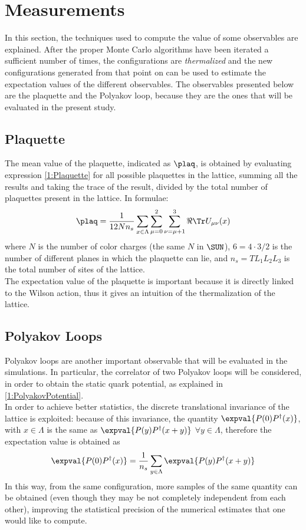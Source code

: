\section{Measurements}
In this section, the techniques used to compute the value of some observables are explained.
After the proper Monte Carlo algorithms have been iterated a sufficient number of times, the configurations are \emph{thermalized} and the new configurations generated from that point on can be used to estimate the expectation values of the different observables.
The observables presented below are the plaquette and the Polyakov loop, because they are the ones that will be evaluated in the present study.

\subsection{Plaquette}
The mean value of the plaquette, indicated as $\plaq$, is obtained by evaluating expression \eqref{1:Plaquette} for all possible plaquettes in the lattice, summing all the results and taking the trace of the result, divided by the total number of plaquettes present in the lattice.
In formulae:
\begin{equation}
    \plaq = \frac{1}{12 N n_s} \sum_{x\in\Lambda} \sum_{\mu=0}^2 \sum_{\substack{\nu=\mu+1}}^3 \Re\Tr U_{\mu\nu}(x) \label{2:LatticePlaquette}
\end{equation}
where $N$ is the number of color charges (the same $N$ in $\SUN$), $6=4\cdot3/2$ is the number of different planes in which the plaquette can lie, and $n_s=TL_1L_2L_3$ is the total number of sites of the lattice.\\
The expectation value of the plaquette is important because it is directly linked to the Wilson action, thus it gives an intuition of the thermalization of the lattice.

\subsection{Polyakov Loops\label{Sec2:PolyakovLoops}}
Polyakov loops are another important observable that will be evaluated in the simulations.
In particular, the correlator of two Polyakov loops will be considered, in order to obtain the static quark potential, as explained in \eqref{1:PolyakovPotential}.\\
In order to achieve better statistics, the discrete translational invariance of the lattice is exploited:
because of this invariance, the quantity $\expval{P(0)P^\dagger(x)}$, with $x\in\Lambda$ is the same as $\expval{P(y)P^\dagger(x+y)}$ $\forall y\in\Lambda$, therefore the expectation value is obtained as
\begin{equation}
    \expval{P(0)P^\dagger(x)} = \frac{1}{n_s} \sum_{y\in\Lambda} \expval{P(y)P^\dagger(x+y)} \label{2:nonzeroMomPolyakov}
\end{equation}
In this way, from the same configuration, more samples of the same quantity can be obtained (even though they may be not completely independent from each other), improving the statistical precision of the numerical estimates that one would like to compute.

